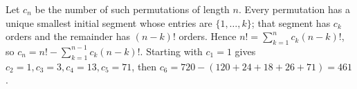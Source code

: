 Let $c_n$ be the number of such permutations of length $n$. Every permutation has a unique smallest initial segment whose entries are $\{1,\ldots,k\}$; that segment has $c_k$ orders and the remainder has $(n-k)!$ orders. Hence $n!=\sum_{k=1}^n c_k(n-k)!$, so $c_n=n!-\sum_{k=1}^{n-1}c_k(n-k)!$. Starting with $c_1=1$ gives $c_2=1,c_3=3,c_4=13,c_5=71$, then $c_6=720-(120+24+18+26+71)=\boxed{461}$.
